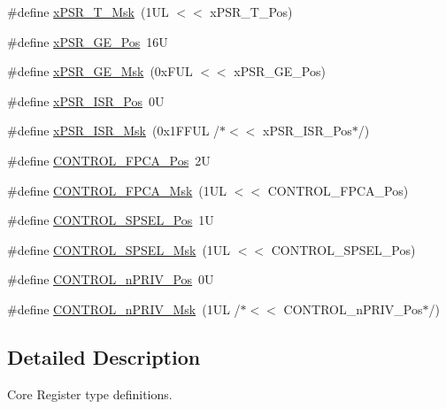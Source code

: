 \begin{DoxyCompactItemize}
\item 
\#define \mbox{\hyperlink{group__CMSIS__CORE_ga30ae2111816e82d47636a8d4577eb6ee}{x\+P\+S\+R\+\_\+\+T\+\_\+\+Msk}}~(1\+U\+L $<$$<$ x\+P\+S\+R\+\_\+\+T\+\_\+\+Pos)
\item 
\#define \mbox{\hyperlink{group__CMSIS__CORE_gae2b0f3def0f378e9f1d10a4c727a064b}{x\+P\+S\+R\+\_\+\+G\+E\+\_\+\+Pos}}~16U
\item 
\#define \mbox{\hyperlink{group__CMSIS__CORE_ga967634e605d013e9b07002eca31f7903}{x\+P\+S\+R\+\_\+\+G\+E\+\_\+\+Msk}}~(0x\+F\+U\+L $<$$<$ x\+P\+S\+R\+\_\+\+G\+E\+\_\+\+Pos)
\item 
\#define \mbox{\hyperlink{group__CMSIS__CORE_ga21bff245fb1aef9683f693d9d7bb2233}{x\+P\+S\+R\+\_\+\+I\+S\+R\+\_\+\+Pos}}~0U
\item 
\#define \mbox{\hyperlink{group__CMSIS__CORE_gadf8eed87e0081dfe1ef1c78a0ea91afd}{x\+P\+S\+R\+\_\+\+I\+S\+R\+\_\+\+Msk}}~(0x1\+F\+F\+U\+L /$\ast$$<$$<$ x\+P\+S\+R\+\_\+\+I\+S\+R\+\_\+\+Pos$\ast$/)
\item 
\#define \mbox{\hyperlink{group__CMSIS__CORE_gac7018b59b07134c5363b33eb94918a58}{C\+O\+N\+T\+R\+O\+L\+\_\+\+F\+P\+C\+A\+\_\+\+Pos}}~2U
\item 
\#define \mbox{\hyperlink{group__CMSIS__CORE_gad20bb0212b2e1864f24af38d93587c79}{C\+O\+N\+T\+R\+O\+L\+\_\+\+F\+P\+C\+A\+\_\+\+Msk}}~(1\+U\+L $<$$<$ C\+O\+N\+T\+R\+O\+L\+\_\+\+F\+P\+C\+A\+\_\+\+Pos)
\item 
\#define \mbox{\hyperlink{group__CMSIS__CORE_ga07eafc53e609895342c6a530e9d01310}{C\+O\+N\+T\+R\+O\+L\+\_\+\+S\+P\+S\+E\+L\+\_\+\+Pos}}~1U
\item 
\#define \mbox{\hyperlink{group__CMSIS__CORE_ga70b29840969b06909da21369b0b05b53}{C\+O\+N\+T\+R\+O\+L\+\_\+\+S\+P\+S\+E\+L\+\_\+\+Msk}}~(1\+U\+L $<$$<$ C\+O\+N\+T\+R\+O\+L\+\_\+\+S\+P\+S\+E\+L\+\_\+\+Pos)
\item 
\#define \mbox{\hyperlink{group__CMSIS__CORE_ga51b95bc03ec0d815b459bde0b14a5908}{C\+O\+N\+T\+R\+O\+L\+\_\+n\+P\+R\+I\+V\+\_\+\+Pos}}~0U
\item 
\#define \mbox{\hyperlink{group__CMSIS__CORE_gaef3b20d77acb213338f89ce5e7bc36b0}{C\+O\+N\+T\+R\+O\+L\+\_\+n\+P\+R\+I\+V\+\_\+\+Msk}}~(1\+U\+L /$\ast$$<$$<$ C\+O\+N\+T\+R\+O\+L\+\_\+n\+P\+R\+I\+V\+\_\+\+Pos$\ast$/)
\end{DoxyCompactItemize}


\subsection{Detailed Description}
Core Register type definitions. 



